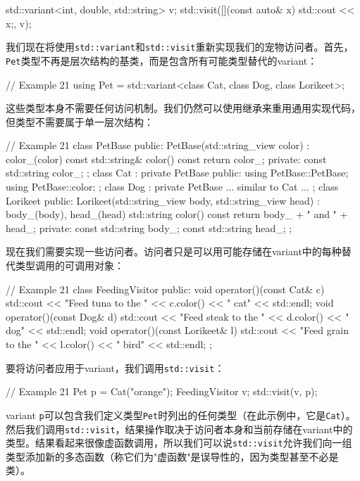 \begin{code}
{\begin{code}
std::variant<int, double, std::string> v;
std::visit([](const auto& x) { std::cout << x;}, v);
\end{code}

我们现在将使用\texttt{std::variant}和\texttt{std::visit}重新实现我们的宠物访问者。首先，\texttt{Pet}类型不再是层次结构的基类，而是包含所有可能类型替代的variant：

\begin{code}
// Example 21
using Pet = 
  std::variant<class Cat, class Dog, class Lorikeet>;
\end{code}

这些类型本身不需要任何访问机制。我们仍然可以使用继承来重用通用实现代码，但类型不需要属于单一层次结构：

\begin{code}
// Example 21
class PetBase {
  public:
  PetBase(std::string_view color) : color_(color) {}
  const std::string& color() const { return color_; }
  private:
  const std::string color_;
};
class Cat : private PetBase {
  public:
  using PetBase::PetBase;
  using PetBase::color;
};
class Dog : private PetBase {
  ... similar to Cat ...
};
class Lorikeet {
  public:
  Lorikeet(std::string_view body, std::string_view head) :
    body_(body), head_(head) {}
  std::string color() const {
    return body_ + " and " + head_;
  }
  private:
  const std::string body_;
  const std::string head_;
};
\end{code}

现在我们需要实现一些访问者。访问者只是可以用可能存储在variant中的每种替代类型调用的可调用对象：

\begin{code}
// Example 21
class FeedingVisitor {
  public:
  void operator()(const Cat& c) {
    std::cout << "Feed tuna to the " << c.color()
              << " cat" << std::endl;
  }
  void operator()(const Dog& d) {
    std::cout << "Feed steak to the " << d.color()
              << " dog" << std::endl;
  }
  void operator()(const Lorikeet& l) {
    std::cout << "Feed grain to the " << l.color()
              << " bird" << std::endl;
  }
};
\end{code}

要将访问者应用于variant，我们调用\texttt{std::visit}：

\begin{code}
// Example 21
Pet p = Cat("orange");
FeedingVisitor v;
std::visit(v, p);
\end{code}

variant \texttt{p}可以包含我们定义类型\texttt{Pet}时列出的任何类型（在此示例中，它是\texttt{Cat}）。然后我们调用\texttt{std::visit}，结果操作取决于访问者本身和当前存储在variant中的类型。结果看起来很像虚函数调用，所以我们可以说\texttt{std::visit}允许我们向一组类型添加新的多态函数（称它们为"虚函数"是误导性的，因为类型甚至不必是类）。

}
\end{code}

